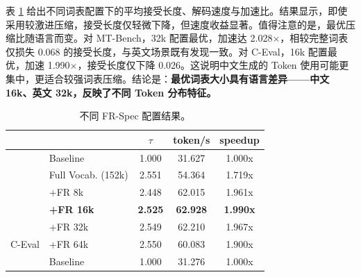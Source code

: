 \documentclass{article} %
\begin{document}
表 \ref{tab:fr} 给出不同词表配置下的平均接受长度、解码速度与加速比。结果显示，即使采用较激进压缩，接受长度仅轻微下降，但速度收益显著。值得注意的是，最优压缩比随语言而变。对 MT-Bench，32k 配置最优，加速达 2.028$\times$，相较完整词表仅损失 0.068 的接受长度，与英文场景既有发现一致。对 C-Eval，16k 配置最优，加速 1.990$\times$，接受长度仅下降 0.026。这说明中文生成的 Token 使用可能更集中，更适合较强词表压缩。结论是：\textbf{最优词表大小具有语言差异——中文 16k、英文 32k，反映了不同 Token 分布特征。}

\begin{table}[htbp]
\centering
\caption{不同 FR-Spec 配置结果。}
\label{tab:fr}
\begin{tabular}{clccc}
\toprule
\multicolumn{1}{l}{}       &                                          & \textbf{$\tau$}                             & \textbf{token/s}                        & \textbf{speedup}                       \\ \midrule
                           & Baseline                                 & 1.000                                  & 31.627                                  & 1.000x                                  \\
                           & Full Vocab. (152k)                    & 2.551                                  & 54.364                                  & 1.719x                                  \\
                           & +FR 8k                                   & 2.448                                  & 62.015                                  & 1.961x                                  \\
                           & \cellcolor[HTML]{E5F6FF}\textbf{+FR 16k} & \cellcolor[HTML]{E5F6FF}\textbf{2.525} & \cellcolor[HTML]{E5F6FF}\textbf{62.928} & \cellcolor[HTML]{E5F6FF}\textbf{1.990x} \\
                           & +FR 32k                                  & 2.549                                  & 62.210                                  & 1.967x                                  \\
\multirow{-6}{*}{C-Eval}   & +FR 64k                                  & 2.550                                  & 60.083                                  & 1.900x                                  \\ \midrule
                           & Baseline                                 & 1.000                                  & 31.276                                  & 1.000x                                  \\

\end{tabular}
\end{table}
\end{document}
